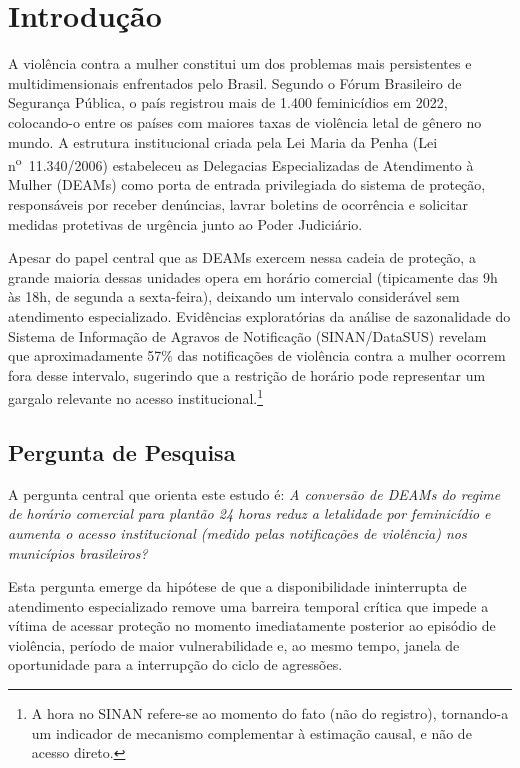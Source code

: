 \documentclass[twocolumn, 10pt]{article}
\begin{document}
\section{Introdução}

A violência contra a mulher constitui um dos problemas mais persistentes
e multidimensionais enfrentados pelo Brasil. Segundo o Fórum Brasileiro de
Segurança Pública, o país registrou mais de 1.400 feminicídios em 2022,
colocando-o entre os países com maiores taxas de violência letal de gênero
no mundo. A estrutura institucional criada pela Lei Maria da Penha
(Lei n\textsuperscript{o}~11.340/2006) estabeleceu as Delegacias Especializadas
de Atendimento à Mulher (DEAMs) como porta de entrada privilegiada do sistema
de proteção, responsáveis por receber denúncias, lavrar boletins de ocorrência
e solicitar medidas protetivas de urgência junto ao Poder Judiciário.

Apesar do papel central que as DEAMs exercem nessa cadeia de proteção, a grande
maioria dessas unidades opera em horário comercial (tipicamente das 9h às 18h,
de segunda a sexta-feira), deixando um intervalo considerável sem atendimento
especializado. Evidências exploratórias da análise de sazonalidade do Sistema de
Informação de Agravos de Notificação (SINAN/DataSUS) revelam que
aproximadamente 57\% das notificações de violência contra a mulher ocorrem fora
desse intervalo, sugerindo que a restrição de horário pode representar um
gargalo relevante no acesso institucional.\footnote{A hora no SINAN refere-se ao
momento do fato (não do registro), tornando-a um indicador de mecanismo
complementar à estimação causal, e não de acesso direto.}

\subsection{Pergunta de Pesquisa}

A pergunta central que orienta este estudo é: \textit{A conversão de DEAMs do
regime de horário comercial para plantão 24 horas reduz a letalidade por
feminicídio e aumenta o acesso institucional (medido pelas notificações de
violência) nos municípios brasileiros?}

Esta pergunta emerge da hipótese de que a disponibilidade ininterrupta de
atendimento especializado remove uma barreira temporal crítica que impede a
vítima de acessar proteção no momento imediatamente posterior ao episódio de
violência, período de maior vulnerabilidade e, ao mesmo tempo, janela de
oportunidade para a interrupção do ciclo de agressões.
\end{document}
